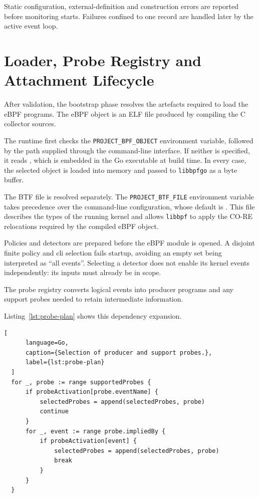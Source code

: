 Static configuration, external-definition and construction errors are reported
before monitoring starts. Failures confined to one record are handled later by
the active event loop.

\section{Loader, Probe Registry and Attachment Lifecycle}
\label{sec:implementation-loader-registry}

After validation, the bootstrap phase resolves the artefacts required to load
  the eBPF programs. The eBPF object is an ELF file produced by compiling the C
  collector sources.

  The runtime first checks the \texttt{PROJECT\_BPF\_OBJECT} environment
  variable, followed by the path supplied through the command-line interface. If
  neither is specified, it reads , which is embedded in
  the Go executable at build time. In every case, the selected object is loaded
  into memory and passed to \texttt{libbpfgo} as a byte buffer.

  The BTF file is resolved separately. The
  \texttt{PROJECT\_BTF\_FILE} environment variable takes precedence over the
  command-line configuration, whose default is
  . This file describes the types of the running
  kernel and allows \texttt{libbpf} to apply the CO-RE relocations required by
  the compiled eBPF object.

Policies and detectors are prepared before the eBPF module is opened. A disjoint 
finite policy and \gls{cli} selection fails startup, avoiding an empty set being interpreted
as ``all events''. Selecting a detector does not enable its kernel events independently: 
its inputs must already be in scope.

The probe registry converts logical events into producer programs and any
support probes needed to retain intermediate information.

Listing~\ref{lst:probe-plan} shows this dependency expansion.

  \begin{lstlisting}[
      language=Go,
      caption={Selection of producer and support probes.},
      label={lst:probe-plan}
  ]
  for _, probe := range supportedProbes {
      if probeActivation[probe.eventName] {
          selectedProbes = append(selectedProbes, probe)
          continue
      }
      for _, event := range probe.impliedBy {
          if probeActivation[event] {
              selectedProbes = append(selectedProbes, probe)
              break
          }
      }
  }
  \end{lstlisting}

